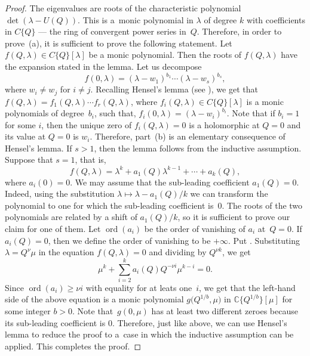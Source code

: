 \documentclass[pdftex]{sigma}
\numberwithin{equation}{section}
\newcommand{\CC}{\mathbb{C}}
\begin{document}
\begin{proof}
The eigenvalues are roots of the characteristic polynomial $\operatorname{det}(\lambda-U(Q))$. This is a~monic polynomial in $\lambda$ of degree $k$ with coefficients in $C\{Q\}$ --- the ring of convergent power series in~$Q$. Therefore, in order to prove~(a), it is sufficient to prove the following statement. Let~${f(Q,\lambda)\in C\{Q\}[\lambda]}$ be a monic polynomial. Then the roots of $f(Q,\lambda)$ have the expansion stated in the lemma. Let us decompose
\[
f(0,\lambda)=(\lambda -w_1)^{b_1}\cdots (\lambda -w_s)^{b_s},
\]
where $w_i\neq w_j$ for $i\neq j$. Recalling Hensel's lemma (see \cite[Chapter 2, Section 2]{GR}), we get that~${f(Q,\lambda) = f_1(Q,\lambda)\cdots f_r(Q,\lambda)}$, where $f_i(Q,\lambda)\in C\{Q\}[\lambda]$ is a monic polynomials of degree~$b_i$, such that, $f_i(0,\lambda)=(\lambda -w_i)^{b_i}$. Note that if $b_i=1$ for some $i$, then the unique zero of $f_i(Q,\lambda)=0$ is a holomorphic at $Q=0$ and its value at $Q=0$ is $w_i$. Therefore, part~(b) is an elementary consequence of Hensel's lemma. If $s>1$, then the lemma follows from the inductive assumption. Suppose that $s=1$, that is,
\[
f(Q,\lambda)=\lambda^k+a_1(Q)\lambda^{k-1}+\cdots + a_k(Q),
\]
where $a_i(0)=0$. We may assume that the sub-leading coefficient $a_1(Q)=0$. Indeed, using the substitution $\lambda\mapsto \lambda - a_1(Q)/k$ we can transform the polynomial to one for which the sub-leading coefficient is~$0$. The roots of the two polynomials are related by a shift of $a_1(Q)/k$, so it is sufficient to prove our claim for one of them. Let $\operatorname{ord}(a_i)$ be the order of vanishing of $a_i$ at~${Q=0}$. If $a_i(Q)=0$, then we define the order of vanishing to be $+\infty$. Put
.
Substituting $\lambda=Q^\nu \mu$ in the equation $f(Q,\lambda)=0$ and dividing by $Q^{\nu k}$, we get
\[
\mu^k+\sum_{i=2}^k a_i(Q)Q^{-\nu i} \mu^{k-i}=0.
\]
Since $\operatorname{ord}(a_i) \geq \nu i$ with equality for at leats one~$i$, we get that the left-hand side of the above equation is a monic polynomial $g\big(Q^{1/b},\mu\big)$ in $\CC\big\{Q^{1/b}\big\} [\mu]$ for some integer $b>0$. Note that~$g(0,\mu)$ has at least two different zeroes because its sub-leading coefficient is $0$. Therefore, just like above, we can use Hensel's lemma to reduce the proof to a~case in which the inductive assumption can be applied. This completes the proof.
\end{proof}
\end{document}

